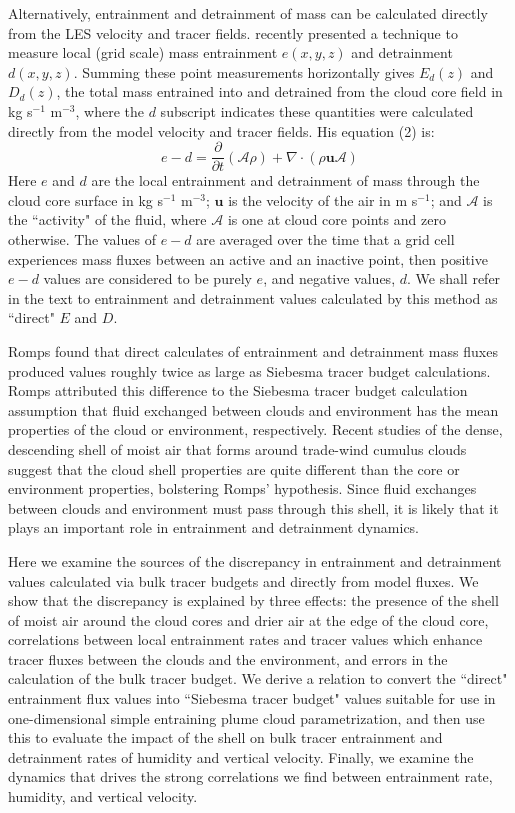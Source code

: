 \documentclass[12pt]{article}
\begin{document}
Alternatively, entrainment and detrainment of mass can be calculated directly
from the LES velocity and tracer fields.  \cite{Romps2010} recently presented a 
technique to measure local (grid scale) mass entrainment $e(x,y,z)$ and
detrainment $d(x,y,z)$.  Summing these point measurements horizontally gives 
$E_d(z)$ and $D_d(z)$, the total mass entrained into and detrained from the
cloud core field in kg s$^{-1}$ m$^{-3}$, where the $d$ subscript indicates 
these quantities were calculated directly from the model velocity and tracer
fields.  His equation (2) is:
\begin{equation}
  \label{eq:romps_e_minus_d}
  e - d = \frac{\partial}{\partial t}(\mathcal{A}\rho) 
        + \nabla \cdot (\rho \mathbf{u} \mathcal{A}) 
\end{equation}
Here $e$ and $d$ are the local entrainment and detrainment of mass through the 
cloud core surface in kg s$^{-1}$ m$^{-3}$; $\mathbf{u}$ is the velocity of the 
air in m s$^{-1}$; and $\mathcal{A}$ is the ``activity" of the fluid, where 
$\mathcal{A}$ is one at cloud core points and zero otherwise.  The values of 
$e - d$ are averaged over the time that a grid cell experiences mass fluxes
between an active and an inactive point, then positive $e-d$ values are
considered to be purely $e$, and negative values, $d$.  We shall refer in the text to entrainment and detrainment values calculated by this method as ``direct"
$E$ and $D$.

Romps found that direct calculates of entrainment and detrainment mass fluxes
produced values roughly twice as large as Siebesma tracer budget calculations.  Romps attributed this difference to the Siebesma tracer budget calculation assumption that fluid exchanged between clouds and environment has the mean
properties of the cloud or environment, respectively.  Recent studies of the
dense, descending shell of moist air that forms around trade-wind cumulus clouds
\citep{Heus2008, Wang2010} suggest that the cloud shell properties are quite
different than the core or environment properties, bolstering Romps' hypothesis.
Since fluid exchanges between clouds and environment must pass through this
shell, it is likely that it plays an important role in entrainment and
detrainment dynamics.

Here we examine the sources of the discrepancy in entrainment and detrainment
values calculated via bulk tracer budgets and directly from model fluxes.  We
show that the discrepancy is explained by three effects: the presence of the
shell of moist air around the cloud cores and drier air at the edge of the 
cloud core, correlations between local entrainment rates and tracer values 
which enhance tracer fluxes between the clouds and the environment, and errors 
in the calculation of the bulk tracer budget.  We derive a relation to convert 
the ``direct" entrainment flux values into ``Siebesma tracer budget" values 
suitable for use in one-dimensional simple entraining plume cloud
parametrization, and then use this to evaluate the impact of the shell on 
bulk tracer entrainment and detrainment rates of humidity and vertical 
velocity.  Finally, we examine the dynamics that drives the strong correlations
we find between entrainment rate, humidity, and vertical velocity.
\end{document}
